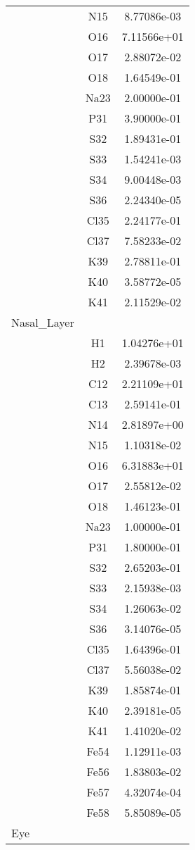 \begin{centering}
\begin{longtable}{l c c}
& N15 & 8.77086e-03 \\ 
& O16 & 7.11566e+01 \\ 
& O17 & 2.88072e-02 \\ 
& O18 & 1.64549e-01 \\ 
& Na23 & 2.00000e-01 \\ 
& P31 & 3.90000e-01 \\ 
& S32 & 1.89431e-01 \\ 
& S33 & 1.54241e-03 \\ 
& S34 & 9.00448e-03 \\ 
& S36 & 2.24340e-05 \\ 
& Cl35 & 2.24177e-01 \\ 
& Cl37 & 7.58233e-02 \\ 
& K39 & 2.78811e-01 \\ 
& K40 & 3.58772e-05 \\ 
& K41 & 2.11529e-02 \\ 
\hline
Nasal_Layer & & \\
\hline
& H1 & 1.04276e+01 \\ 
& H2 & 2.39678e-03 \\ 
& C12 & 2.21109e+01 \\ 
& C13 & 2.59141e-01 \\ 
& N14 & 2.81897e+00 \\ 
& N15 & 1.10318e-02 \\ 
& O16 & 6.31883e+01 \\ 
& O17 & 2.55812e-02 \\ 
& O18 & 1.46123e-01 \\ 
& Na23 & 1.00000e-01 \\ 
& P31 & 1.80000e-01 \\ 
& S32 & 2.65203e-01 \\ 
& S33 & 2.15938e-03 \\ 
& S34 & 1.26063e-02 \\ 
& S36 & 3.14076e-05 \\ 
& Cl35 & 1.64396e-01 \\ 
& Cl37 & 5.56038e-02 \\ 
& K39 & 1.85874e-01 \\ 
& K40 & 2.39181e-05 \\ 
& K41 & 1.41020e-02 \\ 
& Fe54 & 1.12911e-03 \\ 
& Fe56 & 1.83803e-02 \\ 
& Fe57 & 4.32074e-04 \\ 
& Fe58 & 5.85089e-05 \\ 
\hline
Eye & & \\

\end{longtable}
\end{centering}
